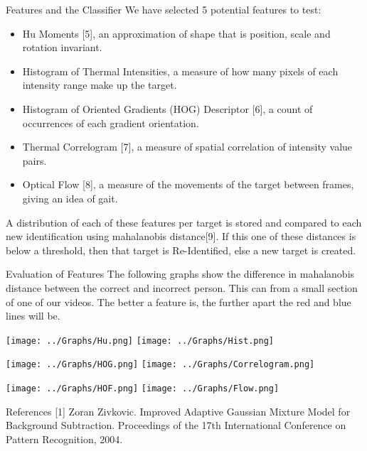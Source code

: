 \documentclass[final]{beamer}
\begin{document}
\begin{frame}{}
\begin{columns}[t]
\begin{column}{.49\linewidth}
        \begin{block}{Features and the Classifier}
        We have selected 5 potential features to test:
          \begin{itemize}
          \item Hu Moments [5], an approximation of shape that is position, scale and rotation invariant.
          \item Histogram of Thermal Intensities, a measure of how many pixels of each intensity range make up the target.
          \item Histogram of Oriented Gradients (HOG) Descriptor [6], a count of  occurrences of each gradient orientation. 
          \item Thermal Correlogram [7], a measure of spatial correlation of intensity value pairs.
          \item Optical Flow [8], a measure of the movements of the target between frames, giving an idea of gait. 
          \end{itemize}
          \justify
          A distribution of each of these features per target is stored and compared to each new identification using mahalanobis distance[9]. If this one of these distances is below a threshold, then that target is Re-Identified, else a new target is created.
        \end{block}
	
        \begin{block}{Evaluation of Features}
        The following graphs show the difference in mahalanobis distance between the correct and incorrect person. This can from a small section of one of our videos. The better a feature is, the further apart the red and blue lines will be. 
        
		\texttt{[image: ../Graphs/Hu.png]}
		\hspace{2cm}
		\texttt{[image: ../Graphs/Hist.png]}
		
		\texttt{[image: ../Graphs/HOG.png]}
		\hspace{2cm}
		\texttt{[image: ../Graphs/Correlogram.png]}
		
		\texttt{[image: ../Graphs/HOF.png]}
		\hspace{2cm}
		\texttt{[image: ../Graphs/Flow.png]}
		
        \end{block}
        
            \begin{block}{References}
    \scriptsize
[1] Zoran Zivkovic. Improved Adaptive Gaussian Mixture Model for Background Subtraction. Proceedings of the 17th International Conference on Pattern Recognition, 2004.
    

\end{block}
\end{column}
\end{columns}
\end{frame}
\end{document}

